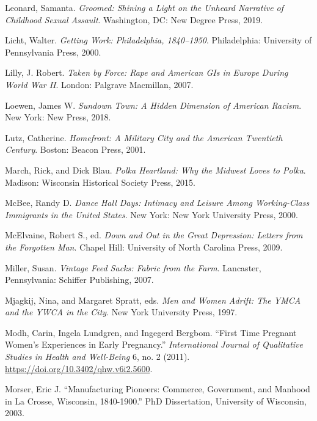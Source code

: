 \documentclass[
  american,
  letterpaper,
]{book}
\newlength{\cslhangindent}
\newenvironment{CSLReferences}[2] %
 {\begin{list}{}{%
  \setlength{\itemindent}{0pt}
  \setlength{\leftmargin}{0pt}
  \setlength{\parsep}{0pt}
  \ifodd #1
   \setlength{\leftmargin}{\cslhangindent}
   \setlength{\itemindent}{-1\cslhangindent}
  \fi
  \setlength{\itemsep}{#2\baselineskip}}}
 {\end{list}}
\begin{document}
\begin{CSLReferences}{1}{0}
Leonard, Samanta. \emph{Groomed: Shining a Light on the Unheard
Narrative of Childhood Sexual Assault}. Washington, DC: New Degree
Press, 2019.

Licht, Walter. \emph{Getting Work: Philadelphia, 1840--1950}.
Philadelphia: University of Pennsylvania Press, 2000.

Lilly, J. Robert. \emph{Taken by Force: Rape and American GIs in Europe
During World War II}. London: Palgrave Macmillan, 2007.

Loewen, James W. \emph{Sundown Town: A Hidden Dimension of American
Racism}. New York: New Press, 2018.

Lutz, Catherine. \emph{Homefront: A Military City and the American
Twentieth Century}. Boston: Beacon Press, 2001.

March, Rick, and Dick Blau. \emph{Polka Heartland: Why the Midwest Loves
to Polka}. Madison: Wisconsin Historical Society Press, 2015.

McBee, Randy D. \emph{Dance Hall Days: Intimacy and Leisure Among
Working-Class Immigrants in the United States}. New York: New York
University Press, 2000.

McElvaine, Robert S., ed. \emph{Down and Out in the Great Depression:
Letters from the Forgotten Man}. Chapel Hill: University of North
Carolina Press, 2009.

Miller, Susan. \emph{Vintage Feed Sacks: Fabric from the Farm}.
Lancaster, Pennsylvania: Schiffer Publishing, 2007.

Mjagkij, Nina, and Margaret Spratt, eds. \emph{Men and Women Adrift: The
YMCA and the YWCA in the City}. New York University Press, 1997.

Modh, Carin, Ingela Lundgren, and Ingegerd Bergbom. {``First Time
Pregnant Women's Experiences in Early Pregnancy.''} \emph{International
Journal of Qualitative Studies in Health and Well-Being} 6, no. 2
(2011). \url{https://doi.org/10.3402/qhw.v6i2.5600}.

Morser, Eric J. {``Manufacturing Pioneers: Commerce, Government, and
Manhood in La Crosse, Wisconsin, 1840-1900.''} PhD Dissertation,
University of Wisconsin, 2003.


\end{CSLReferences}
\end{document}

